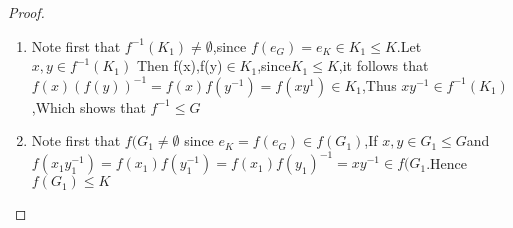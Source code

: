 \documentclass[cn,10pt,math=newtx,citestyle=gb7714-2015,bibstyle=gb7714-2015]{elegantbook}
\begin{document}
\begin{proof}
    \begin{enumerate}
        \item Note first that $f^{-1}(K_1) \neq \emptyset$,since $f(e_G)=e_K\in K_1\leq K$.Let$x,y\in f^{-1}(K_1)$ Then f(x),f(y)$\in K_1$,since$K_1 \leq K$,it follows that $f(x)(f(y))^{-1}=f(x)f(y^{-1})=f(xy^{1})\in K_1$,Thus $xy^{-1}\in f^{-1}(K_1)$,Which shows that $f^{-1}\leq G$ 
        \item Note first that $f(G_1\neq \emptyset$ since $e_K = f(e_G)\in f(G_1)$,If $x,y\in G_1 \leq G$and $f(x_1y_1^{-1})=f(x_1)f(y_1^{-1})=f(x_1)f(y_1)^{-1}=xy^{-1}\in f(G_1$.Hence $f(G_1)\leq K$
    \end{enumerate}
\end{proof}

    




\end{document}
